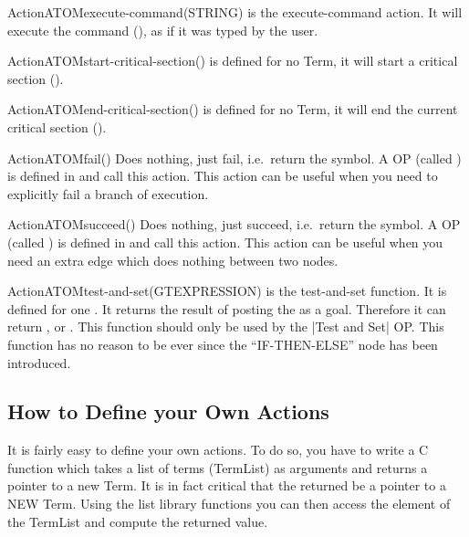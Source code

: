 \begin{typeefa}{Action}{ATOM}{execute-command}{(STRING)} 
is the execute-command action. It will execute the command (), as if it was typed by the user.
\end{typeefa}

\begin{typeefa}{Action}{ATOM}{start-critical-section}{()}
is defined for no Term, it will start a critical section (). 
\end{typeefa}

\begin{typeefa}{Action}{ATOM}{end-critical-section}{()}
is defined for no Term, it will end the current critical section
(). 
\end{typeefa}

\begin{typeefa}{Action}{ATOM}{fail}{()}
Does nothing, just fail, i.e.\ return the  symbol. A OP (called
) is defined in  and call this action. This
action can be useful when you need to explicitly fail a branch of execution.
\end{typeefa}

\begin{typeefa}{Action}{ATOM}{succeed}{()}
Does nothing, just succeed, i.e.\ return the  symbol. A OP (called
) is defined in  and call this action. This
action can be useful when you need an extra edge which does nothing between two nodes.
\end{typeefa}

\begin{typeefa}{Action}{ATOM}{test-and-set}{(GTEXPRESSION)}
is the test-and-set function. It is defined for one . It
returns the result of posting the  as a goal. Therefore it can
return ,  or . This function should only be
used by the |Test and Set| OP. This function has no reason to be ever since the
``IF-THEN-ELSE'' node has been introduced. 
\end{typeefa}

\subsection{How to Define your Own Actions}

It is fairly easy to define your own actions. To do so, you have to write a C
function which takes a list of terms (TermList) as arguments and returns a
pointer to a new Term. It is in fact critical that the  returned be a
pointer to a NEW Term. Using the list library functions you can then access the
element of the TermList and compute the returned value.

